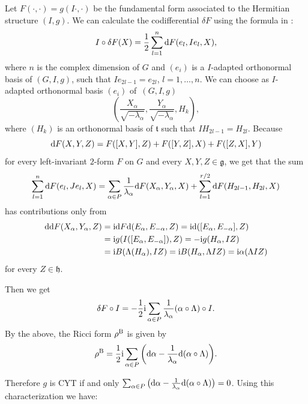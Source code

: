 \documentclass[pdftex]{sigma}
\numberwithin{equation}{section}
\begin{document}
Let $F(\cdot, \cdot) = g (I \cdot, \cdot)$ be the fundamental form associated to the Hermitian structure $(I, g)$.
We can calculate the codifferential $\delta F$ using the formula in \cite{Gau}:
\begin{equation*}%
I \circ \delta F (X) = \frac 12 \sum_{l=1}^{n} {\rm d}F (e_l, I e_l, X),
\end{equation*}
where $n$ is the complex dimension of $G$ and $(e_i)$ is a $I$-adapted orthonormal basis of $(G, I, g)$, such that $I e_{2l -1} = e_{2l}$, $l = 1, \dots, n$. We can choose as $I$-adapted orthonormal basis $(e_i)$ of~$(G, I, g)$
\[
\left(\frac{X_{\alpha}}{ \sqrt{-\lambda_{\alpha}}},\frac{Y_{\alpha}}{ \sqrt{- \lambda_{\alpha}}}, H_k \right),
\]
where $(H_k)$ is an orthonormal basis of $\mathfrak t$ such that $I H_{2l -1} = H_{2l}$.
Because
\[
{\rm d}F(X,Y,Z)=F([X,Y],Z)+F([Y,Z],X)+F([Z,X],Y)
\]
 for every left-invariant $2$-form $F$ on $G$ and every $X,Y, Z \in \mathfrak g$, we get that the sum
 \[
 \sum_{l=1}^{n} {\rm d}F(e_l, Je_l, X) = \sum_{\alpha \in P} \frac{1}{\lambda_{\alpha}} {\rm d}F(X_{\alpha}, Y_{\alpha}, X) + \sum_{l =1}^{r/2} {\rm d}F( H_{2l -1}, H_{2l}, X)
 \]
 has
contributions only from
\begin{align*}
{\rm d}{\rm d}F(X_{\alpha}, Y_{\alpha}, Z) &= {\rm i}{\rm d}F{\rm d}(E_{\alpha},E_{-\alpha}, Z) = {\rm i}{\rm d}([E_{\alpha}, E_{-\alpha}], Z)\\
& = {\rm i}g (I ([E_{\alpha}, E_{-\alpha}]), Z) = - {\rm i}g( H_{\alpha}, IZ)\\
& = {\rm i}B (\Lambda( H_{\alpha}), IZ) = {\rm i}B (H_{\alpha}, \Lambda IZ) = {\rm i}\alpha (\Lambda I Z)
\end{align*}
 for every $Z\in \mathfrak{h}$.

Then we get
\[
\delta F \circ
I = - \frac {1} {2} {\rm i} \sum_{\alpha \in P} \frac{1} {\lambda_{\alpha}} (\alpha \circ \Lambda) \circ I.
\]
 By the above, the Ricci form $\rho^{\rm B}$ is given by
\[
\rho^{\rm B} = \frac{1}{2} {\rm i} \sum_{\alpha \in P} \bigg({\rm d}\alpha - \frac{1}{\lambda_{\alpha}} {\rm d} (\alpha\circ\Lambda) \bigg).
\]

Therefore $g$ is CYT if and only $\sum_{\alpha \in P} \big({\rm d}\alpha - \frac{1}{\lambda_{\alpha}} {\rm d}(\alpha\circ\Lambda) \big ) =0$. Using this characterization we have:
\end{document}
